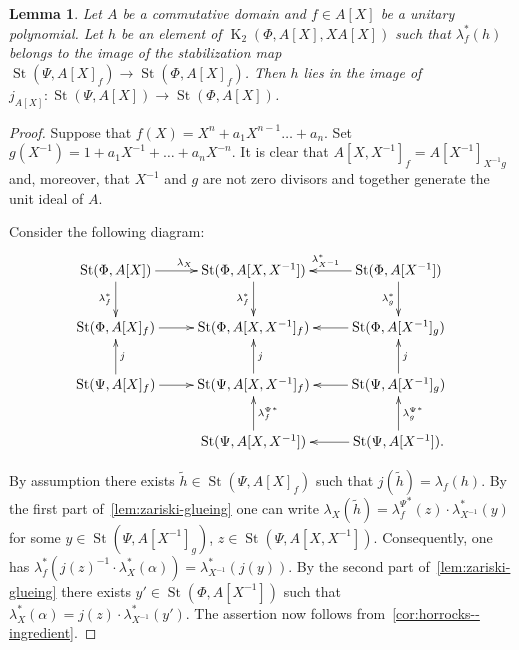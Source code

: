 \documentclass[oneside, 10pt]{amsart}
\DeclareMathOperator{\St}{St}
\DeclareMathOperator{\K}{K}
\newcommand{\inv}{^{-1}}
\numberwithin{equation}{section}
\numberwithin{thm}{section}
\newtheorem{lemma}[thm]{Lemma}
\numberwithin{lemma}{section}
\theoremstyle{definition}
\theoremstyle{remark}
\begin{document}
\begin{lemma} \label{lem:horrocks-b}
Let $A$ be a commutative domain and $f \in A[X]$ be a unitary polynomial.
Let $h$ be an element of $\K_2(\Phi, A[X], XA[X])$ such that $\lambda_f^*(h)$ belongs to the image of the stabilization map
$\St(\Psi, A[X]_f) \to \St(\Phi, A[X]_f)$.
Then $h$ lies in the image of $j_{A[X]}\colon\St(\Psi, A[X]) \to \St(\Phi, A[X])$.
\end{lemma}
\begin{proof}
Suppose that $f(X) = X^n + a_1 X^{n-1} \ldots + a_n$.
Set $g(X\inv) = 1 + a_1 X\inv + \ldots + a_{n} X^{-n}$.
It is clear that $A[X, X\inv]_f = A[X\inv]_{X\inv g}$ and, moreover, that $X\inv$ and $g$ are not zero divisors and together generate the unit ideal of $A$.

Consider the following diagram:
\[ \xymatrix{\St(\Phi, A[X]) \ar[r]^{\lambda_X} \ar[d]_{\lambda_f^*} & \St(\Phi, A[X, X\inv]) \ar[d]_{\lambda_f^*}  & \St(\Phi, A[X\inv]) \ar[l]_{\lambda_{X\inv}^*} \ar[d]_{\lambda_g^*}  \\
\St(\Phi, A[X]_f) \ar[r] & \St(\Phi, A[X, X\inv]_f) & \St(\Phi, A[X\inv]_g) \ar[l] \\
\St(\Psi, A[X]_f) \ar[r] \ar[u]_j & \St(\Psi, A[X, X\inv]_f) \ar[u]_j & \St(\Psi, A[X\inv]_g) \ar[l] \ar[u]_j \\
& \St(\Psi, A[X, X\inv]) \ar[u]_{{\lambda_f^\Psi}^*}   & \St(\Psi, A[X\inv]). \ar[l] \ar[u]_{{\lambda_g^\Psi}^*}}\]

By assumption there exists $\widetilde{h} \in \St(\Psi, A[X]_f)$ such that $j(\widetilde{h}) = \lambda_f(h)$.
By the first part of~\cref{lem:zariski-glueing} one can write
$\lambda_X(\widetilde{h}) = {\lambda_f^\Psi}^*(z) \cdot \lambda_{X\inv}^*(y)$
for some $y \in \St(\Psi, A[X\inv]_g)$, $z \in \St(\Psi, A[X, X\inv]).$
Consequently, one has $\lambda_f^*(j(z)\inv \cdot \lambda_X^*(\alpha)) = \lambda_{X\inv}^*(j(y))$.
By the second part of~\cref{lem:zariski-glueing} there exists $y' \in \St(\Phi, A[X\inv])$ such that $\lambda_X^*(\alpha) = j(z) \cdot \lambda_{X\inv}^*(y').$
The assertion now follows from~\cref{cor:horrocks--ingredient}.
\end{proof}
\end{document}
